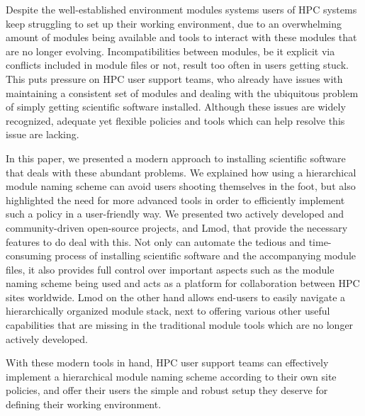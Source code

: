 Despite the well-established environment modules systems users of HPC systems keep
struggling to set up their working environment, due to an overwhelming amount of
modules being available and tools to interact with these modules that are no longer
evolving. Incompatibilities between modules, be it explicit via conflicts included
in module files or not, result too often in users getting stuck. This puts pressure on
HPC user support teams, who already have issues with maintaining a consistent set of
modules and dealing with the ubiquitous problem of simply getting scientific software
installed. Although these issues are widely recognized, adequate yet flexible policies
and tools which can help resolve this issue are lacking.

In this paper, we presented a modern approach to installing scientific software that
deals with these abundant problems. We explained how using a hierarchical module naming
scheme can avoid users shooting themselves in the foot, but also highlighted the need
for more advanced tools in order to efficiently implement such a policy in a
user-friendly way. We presented two actively developed and community-driven open-source
projects, \easybuild{} and Lmod, that provide the necessary features to do deal with
this. Not only can \easybuild{} automate the tedious and time-consuming process of
installing scientific software and the accompanying module files, it also provides
full control over important aspects such as the module naming scheme being used and
acts as a platform for collaboration between HPC sites worldwide. Lmod on the other
hand allows end-users to easily navigate a hierarchically organized module stack, next
to offering various other useful capabilities that are missing in the traditional
module tools which are no longer actively developed.

With these modern tools in hand, HPC user support teams can effectively implement a
hierarchical module naming scheme according to their own site policies, and offer
their users the simple and robust setup they deserve for defining their working
environment.
